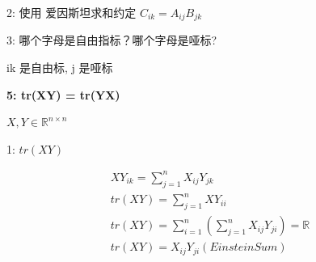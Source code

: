 \documentclass[12pt]{article}
\begin{document}
2: 使用 爱因斯坦求和约定
$C_{ik} = A_{ij}B_{jk}$

3: 哪个字母是自由指标？哪个字母是哑标?

ik 是自由标, j 是哑标


\vspace{0.5em}
\noindent\textbf{5: tr(XY) = tr(YX)}

$X,Y \in \mathbb{R}^{n \times n}$

1: $tr(XY)$

\begin{align}
    XY_{ik} = \sum_{j = 1}^{n}X_{ij}Y_{jk}                               \\
    tr(XY) =  \sum_{j = 1}^{n}XY_{ii}                                    \\
    tr(XY) = \sum_{i = 1}^{n}(\sum_{j = 1}^{n}X_{ij}Y_{ji}) = \mathbb{R} \\
    tr(XY) = X_{ij}Y_{ji}(EinsteinSum)
\end{align}
\end{document}
